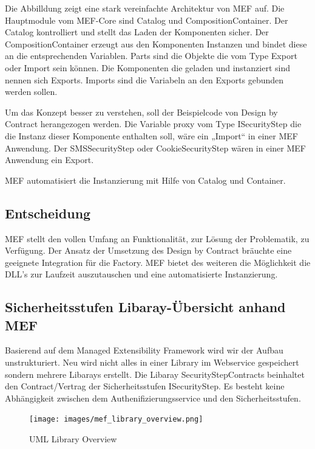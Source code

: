 Die Abbilldung zeigt eine stark vereinfachte Architektur von MEF auf.
Die Hauptmodule vom MEF-Core sind Catalog und CompositionContainer. Der
Catalog kontrolliert und stellt das Laden der Komponenten sicher. Der
CompositionContainer erzeugt aus den Komponenten Instanzen und bindet
diese an die entsprechenden Variablen. Parts sind die Objekte die vom
Type Export oder Import sein können. Die Komponenten die geladen und
instanziert sind nennen sich Exports. Imports sind die Variabeln an den
Exports gebunden werden sollen.

Um das Konzept besser zu verstehen, soll der Beispielcode von Design by
Contract herangezogen werden. Die Variable proxy vom Type ISecurityStep
die die Instanz dieser Komponente enthalten soll, wäre ein „Import`` in
einer MEF Anwendung. Der SMSSecurityStep oder CookieSecurityStep wären
in einer MEF Anwendung ein Export.

MEF automatisiert die Instanzierung mit Hilfe von Catalog und Container.

\subsection{Entscheidung}\label{entscheidung-1}

MEF stellt den vollen Umfang an Funktionalität, zur Lösung der
Problematik, zu Verfügung. Der Ansatz der Umsetzung des Design by
Contract bräuchte eine geeignete Integration für die Factory. MEF bietet
des weiteren die Möglichkeit die DLL's zur Laufzeit auszutauschen und
eine automatisierte Instanzierung.

\newpage

\subsection{Sicherheitsstufen Libaray-Übersicht anhand
MEF}\label{sicherheitsstufen-libaray-uxfcbersicht-anhand-mef}

Basierend auf dem Managed Extensibility Framework wird wir der Aufbau
unstrukturiert. Neu wird nicht alles in einer Library im Webservice
gespeichert sondern mehrere Libarays erstellt. Die Libaray
SecurityStepContracts beinhaltet den Contract/Vertrag der
Sicherheitsstufen ISecurityStep. Es besteht keine Abhängigkeit zwischen
dem Authenifizierungsservice und den Sicherheitsstufen.

\begin{figure}[htbp]
\centering
\texttt{[image: images/mef\_library\_overview.png]}
\caption{UML Library Overview}
\end{figure}

